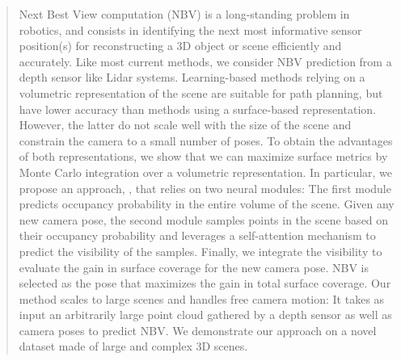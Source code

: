 \begin{abstract}
  Next Best View computation (NBV) is a long-standing problem in robotics, and consists in identifying the next most informative sensor position(s) for reconstructing a 3D object or scene efficiently and accurately. Like most current methods, we consider NBV prediction from a depth sensor like Lidar systems. Learning-based methods relying on a volumetric representation of the scene are suitable for path planning, but have lower accuracy than methods using a surface-based representation. However, the latter do not scale well with the size of the scene and constrain the camera to a small number of poses. To obtain the advantages of both representations, we show that we can maximize surface metrics by Monte Carlo integration over a volumetric representation. In particular, we propose an approach, \method, that relies on two neural modules: The first module predicts occupancy probability in the entire volume of the scene. Given any new camera pose, the second module samples points in the scene based on their occupancy probability and leverages a self-attention mechanism to predict the visibility of the samples. Finally, we integrate the visibility to evaluate the gain in surface coverage for the new camera pose. NBV is selected as the pose that maximizes the gain in total surface coverage. Our method scales to large scenes and handles free camera motion: It takes as input an arbitrarily large point cloud gathered by a depth sensor as well as camera poses to predict NBV. We demonstrate our approach on a novel dataset made of large and complex 3D scenes.
\end{abstract}


